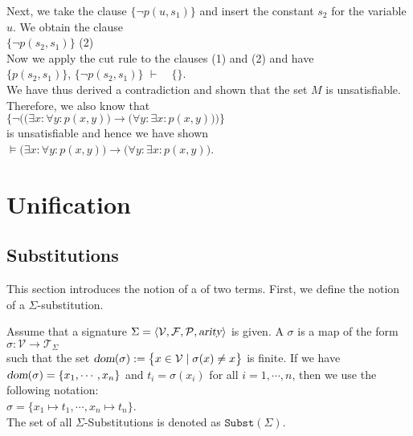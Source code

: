 Next, we take the clause $\big\{\neg p(u,s_1)\big\}$ and
insert the constant $s_2$ for the variable $u$.  We obtain the 
clause \\[0.2cm]
\hspace*{1.3cm} $\big\{\neg p(s_2,s_1)\big\}$ \hspace*{\fill} (2) \\[0.2cm]
Now we apply the cut rule to the clauses (1) and (2) and have \\[0.2cm]
\hspace*{1.3cm} 
$\big\{ p(s_2,s_1) \big\}$, \quad$\big\{\neg p(s_2,s_1)\big\}$ \quad $\vdash \quad \{\}$.
\\[0.2cm]
We have thus derived a contradiction and shown that the set $M$ is unsatisfiable.  Therefore, we also know that
\\[0.2cm]
\hspace*{1.3cm} 
$\Big\{ \neg \Big(\big(\exists x\colon \forall y\colon  p(x,y)\big) \rightarrow  \big(\forall y\colon \exists x\colon p(x,y)\big)\Big)\Big\}$
\\[0.2cm]
is unsatisfiable and hence we have shown \\[0.2cm]
\hspace*{1.3cm} 
$\models \big(\exists x\colon \forall y\colon  p(x,y)\big) \rightarrow  \big(\forall y\colon \exists x\colon p(x,y)\big)$.

\section{Unification}
\subsection{Substitutions}
This section introduces the notion of a  of two terms.
First, we define the notion of a $\Sigma$-substitution.

\begin{Definition}
  Assume that a signature $\Sigma = \langle \mathcal{V}, \mathcal{F}, \mathcal{P}, \textsl{arity} \rangle$ is given.
  A  $\sigma$ is a map of the form
  \\[0.2cm]
  \hspace*{1.3cm}
  $\sigma: \mathcal{V} \rightarrow \mathcal{T}_\Sigma$ 
  \\[0.2cm]
  such that the set $\textsl{dom}(\sigma) := \bigl\{ x \in \mathcal{V} \mid \sigma(x) \not= x \bigr\}$ is finite.
  If we have $\textsl{dom}(\sigma) = \{ x_1, \cdots, x_n \}$ and $t_i = \sigma(x_i)$ for all $i = 1, \cdots, n$,
  then we use the following notation:
  \\[0.2cm]
  \hspace*{1.3cm}
  $\sigma = \{ x_1 \mapsto t_1, \cdots, x_n \mapsto t_n \}$.
  \\[0.2cm]
  The set of all $\Sigma$-Substitutions is denoted as $\mathtt{Subst}(\Sigma)$.
  \eox
\end{Definition}

